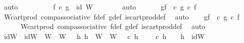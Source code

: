 \begin{isabellebody}
\ auto\isanewline
\ \ \ \ \isamarkupfalse%
\ {}\ {}\ \isamarkupfalse%
\ {\isachardoublequoteopen}f\ {\isasymcirc}\isactrlsub c\ g\ {\isacharequal}{\kern0pt}\ id\ W{\isacharprime}{\kern0pt}{\isachardoublequoteclose}\isanewline
\ \ \ \ \ \ \isamarkupfalse%
\ auto\isanewline
\ \ \isamarkupfalse%
\isanewline
\isanewline
\ \ \isamarkupfalse%
\ gf{}{\isacharcolon}{\kern0pt}\ {\isachardoublequoteopen}{\isasympi}\ {\isasymcirc}\isactrlsub c\ {\isacharparenleft}{\kern0pt}g\ {\isasymcirc}\isactrlsub c\ f{\isacharparenright}{\kern0pt}\ {\isacharequal}{\kern0pt}\ {\isasympi}\isanewline
\ \ \ \ \isamarkupfalse%
\ W{\isacharunderscore}{\kern0pt}cart{\isacharunderscore}{\kern0pt}prod\ comp{\isacharunderscore}{\kern0pt}associative{}\ f{\isacharunderscore}{\kern0pt}def\ g{\isacharunderscore}{\kern0pt}def\ is{\isacharunderscore}{\kern0pt}cart{\isacharunderscore}{\kern0pt}prod{\isacharunderscore}{\kern0pt}def\ \isamarkupfalse%
\ auto\isanewline
\ \ \isamarkupfalse%
\ gf{}{\isacharcolon}{\kern0pt}\ {\isachardoublequoteopen}{\isasympi}\ {\isasymcirc}\isactrlsub c\ {\isacharparenleft}{\kern0pt}g\ {\isasymcirc}\isactrlsub c\ f{\isacharparenright}{\kern0pt}\ {\isacharequal}{\kern0pt}\ {\isasympi}\isanewline
\ \ \ \ \isamarkupfalse%
\ W{\isacharunderscore}{\kern0pt}cart{\isacharunderscore}{\kern0pt}prod\ comp{\isacharunderscore}{\kern0pt}associative{}\ f{\isacharunderscore}{\kern0pt}def\ g{\isacharunderscore}{\kern0pt}def\ is{\isacharunderscore}{\kern0pt}cart{\isacharunderscore}{\kern0pt}prod{\isacharunderscore}{\kern0pt}def\ \isamarkupfalse%
\ auto\isanewline
\isanewline
\ \ \isamarkupfalse%
\ idW\ \ {\isachardoublequoteopen}idW\ {\isacharcolon}{\kern0pt}\ W\ {\isasymrightarrow}\ W\ {\isasymand}\ {\isacharparenleft}{\kern0pt}{\isasymforall}\ h{}{\isachardot}{\kern0pt}\ {\isacharparenleft}{\kern0pt}h{}\ {\isacharcolon}{\kern0pt}\ W\ {\isasymrightarrow}\ W\ {\isasymand}\ {\isasympi}\ {\isasymcirc}\isactrlsub c\ h{}\ {\isacharequal}{\kern0pt}\ {\isasympi}\ {\isasymand}\ {\isasympi}\ {\isasymcirc}\isactrlsub c\ h{}\ {\isacharequal}{\kern0pt}\ {\isasympi}\ {\isasymlongrightarrow}\ h{}\ {\isacharequal}{\kern0pt}\ idW{\isacharparenright}{\kern0pt}{\isachardoublequoteclose}\isanewline

\end{isabellebody}
